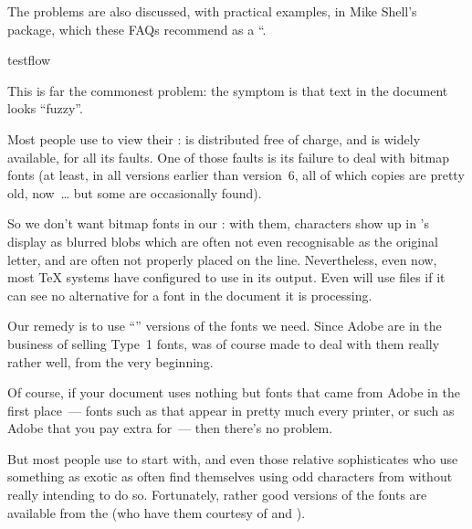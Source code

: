 The problems are also discussed, with practical examples, in Mike
Shell's  package, which these FAQs recommend as a
``.
\begin{ctanrefs}
\item[testflow]
\end{ctanrefs}



This is far the commonest problem: the symptom is that text in the
document looks ``fuzzy''.

Most people use   
to view their :  is distributed free of
charge, and is widely available, for all its faults.  One of those
faults is its failure to deal with bitmap fonts (at least, in all
versions earlier than version~6, all of which copies are pretty old,
now~\dots{} but some are occasionally found).

So we don't want bitmap fonts in our \PS{}: with them, characters show
up in 's display as blurred blobs which are often not
even recognisable as the original letter, and are often not properly placed
on the line.  Nevertheless, even now, most \TeX{} systems have
 configured to use
 in its output.  Even
\PDFTeX{} will use  files if it can see no alternative for
a font in the document it is processing.

Our remedy is to use
``''
versions of the fonts we need.  Since Adobe are in the
business of selling Type~1 fonts,  was of course made
to deal with them really rather well, from the very beginning.

Of course, if your document uses nothing but fonts that came from
Adobe in the first place~--- fonts such as  that
appear in pretty much every \PS{} printer, or such as Adobe
 that you pay extra for~--- then there's no problem.

But most people use   to start
with, and even those relative sophisticates who use something as
exotic as  often find themselves using odd characters
from  without really intending to do so.  Fortunately, rather
good versions of the  fonts are available from the 
(who have them courtesy of %
 and \YandY{}).


